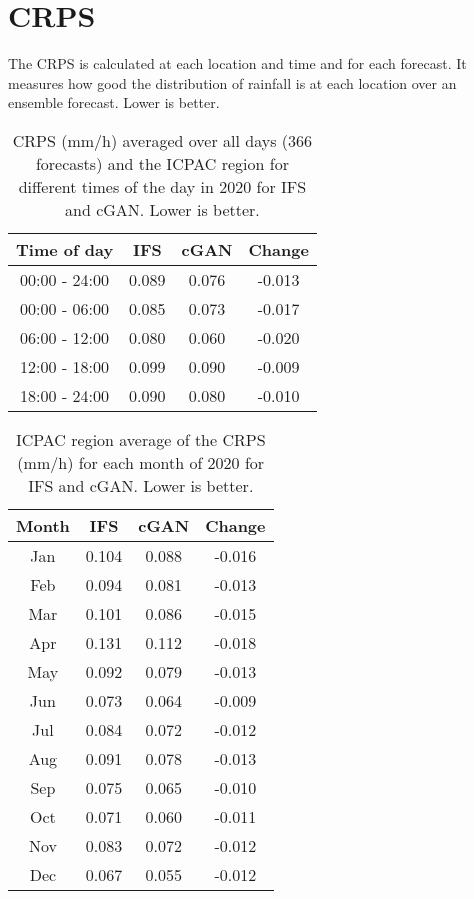 \documentclass[12pt]{article}
\begin{document}

\section{CRPS}

The CRPS is calculated at each location and time and for each forecast. It measures how good the distribution of rainfall is at each location over an ensemble forecast. Lower is better.

\begin{table}
\centering
\begin{tabular}{|c|c|c|c|}
\hline
Time of day & IFS & cGAN & Change \\
\hline
00:00 - 24:00 & 0.089 & 0.076 & -0.013 \\
\hline
00:00 - 06:00 & 0.085 & 0.073 & -0.017 \\
06:00 - 12:00 & 0.080 & 0.060 & -0.020 \\
12:00 - 18:00 & 0.099 & 0.090 & -0.009 \\
18:00 - 24:00 & 0.090 & 0.080 & -0.010 \\
\hline
\end{tabular}
\caption{CRPS (mm/h) averaged over all days (366 forecasts) and the ICPAC region for different times of the day in 2020 for IFS and cGAN. Lower is better.}
\end{table}

\begin{table}
\centering
\begin{tabular}{|c|c|c|c|}
\hline
Month & IFS & cGAN & Change \\
\hline
Jan & 0.104 & 0.088 & -0.016 \\
Feb &0.094 & 0.081 & -0.013 \\
Mar & 0.101 & 0.086 & -0.015 \\
Apr & 0.131 & 0.112 & -0.018 \\
May & 0.092 & 0.079 & -0.013 \\
Jun & 0.073 & 0.064 & -0.009 \\
Jul & 0.084 & 0.072 & -0.012 \\
Aug & 0.091 & 0.078 & -0.013 \\
Sep & 0.075 & 0.065 & -0.010 \\
Oct & 0.071 & 0.060 & -0.011 \\
Nov & 0.083 & 0.072 & -0.012 \\
Dec & 0.067 & 0.055 & -0.012 \\
\hline
\end{tabular}
\caption{ICPAC region average of the CRPS (mm/h) for each month of 2020 for IFS and cGAN. Lower is better.}
\end{table}
\end{document}
